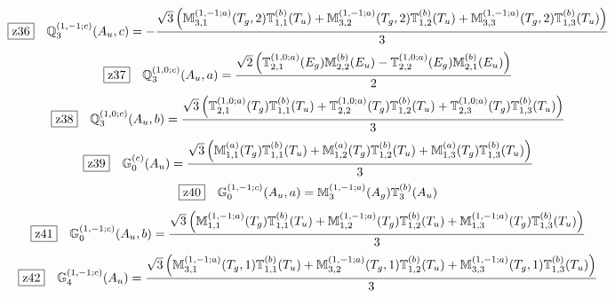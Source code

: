 \documentclass[fleqn,10pt,landscape]{jsarticle}
\begin{document}
\begin{dmath*}
\hspace*{3mm}\fbox{z36}\quad \mathbb{Q}_{3}^{(1,-1;c)}(A_{u},c)=- \frac{\sqrt{3} \left(\mathbb{M}_{3,1}^{(1,-1;a)}(T_{g},2) \mathbb{T}_{1,1}^{(b)}(T_{u}) + \mathbb{M}_{3,2}^{(1,-1;a)}(T_{g},2) \mathbb{T}_{1,2}^{(b)}(T_{u}) + \mathbb{M}_{3,3}^{(1,-1;a)}(T_{g},2) \mathbb{T}_{1,3}^{(b)}(T_{u})\right)}{3}
\end{dmath*}
\begin{dmath*}
\hspace*{3mm}\fbox{z37}\quad \mathbb{Q}_{3}^{(1,0;c)}(A_{u},a)=\frac{\sqrt{2} \left(\mathbb{T}_{2,1}^{(1,0;a)}(E_{g}) \mathbb{M}_{2,2}^{(b)}(E_{u}) - \mathbb{T}_{2,2}^{(1,0;a)}(E_{g}) \mathbb{M}_{2,1}^{(b)}(E_{u})\right)}{2}
\end{dmath*}
\begin{dmath*}
\hspace*{3mm}\fbox{z38}\quad \mathbb{Q}_{3}^{(1,0;c)}(A_{u},b)=\frac{\sqrt{3} \left(\mathbb{T}_{2,1}^{(1,0;a)}(T_{g}) \mathbb{T}_{1,1}^{(b)}(T_{u}) + \mathbb{T}_{2,2}^{(1,0;a)}(T_{g}) \mathbb{T}_{1,2}^{(b)}(T_{u}) + \mathbb{T}_{2,3}^{(1,0;a)}(T_{g}) \mathbb{T}_{1,3}^{(b)}(T_{u})\right)}{3}
\end{dmath*}
\begin{dmath*}
\hspace*{3mm}\fbox{z39}\quad \mathbb{G}_{0}^{(c)}(A_{u})=\frac{\sqrt{3} \left(\mathbb{M}_{1,1}^{(a)}(T_{g}) \mathbb{T}_{1,1}^{(b)}(T_{u}) + \mathbb{M}_{1,2}^{(a)}(T_{g}) \mathbb{T}_{1,2}^{(b)}(T_{u}) + \mathbb{M}_{1,3}^{(a)}(T_{g}) \mathbb{T}_{1,3}^{(b)}(T_{u})\right)}{3}
\end{dmath*}
\begin{dmath*}
\hspace*{3mm}\fbox{z40}\quad \mathbb{G}_{0}^{(1,-1;c)}(A_{u},a)=\mathbb{M}_{3}^{(1,-1;a)}(A_{g}) \mathbb{T}_{3}^{(b)}(A_{u})
\end{dmath*}
\begin{dmath*}
\hspace*{3mm}\fbox{z41}\quad \mathbb{G}_{0}^{(1,-1;c)}(A_{u},b)=\frac{\sqrt{3} \left(\mathbb{M}_{1,1}^{(1,-1;a)}(T_{g}) \mathbb{T}_{1,1}^{(b)}(T_{u}) + \mathbb{M}_{1,2}^{(1,-1;a)}(T_{g}) \mathbb{T}_{1,2}^{(b)}(T_{u}) + \mathbb{M}_{1,3}^{(1,-1;a)}(T_{g}) \mathbb{T}_{1,3}^{(b)}(T_{u})\right)}{3}
\end{dmath*}
\begin{dmath*}
\hspace*{3mm}\fbox{z42}\quad \mathbb{G}_{4}^{(1,-1;c)}(A_{u})=\frac{\sqrt{3} \left(\mathbb{M}_{3,1}^{(1,-1;a)}(T_{g},1) \mathbb{T}_{1,1}^{(b)}(T_{u}) + \mathbb{M}_{3,2}^{(1,-1;a)}(T_{g},1) \mathbb{T}_{1,2}^{(b)}(T_{u}) + \mathbb{M}_{3,3}^{(1,-1;a)}(T_{g},1) \mathbb{T}_{1,3}^{(b)}(T_{u})\right)}{3}
\end{dmath*}
\end{document}

